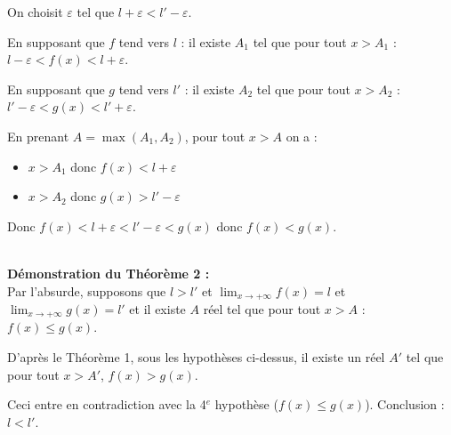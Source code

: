 \documentclass[11pt,a4paper]{article}
\begin{document}
\hfill
\begin{minipage}{0.5\textwidth}
    

    On choisit $\varepsilon$ tel que $l+\varepsilon < l'-\varepsilon$. 

    En supposant que $f$ tend vers $l$ : il existe $A_1$ tel que pour tout $x>A_1$ : $l-\varepsilon < f(x) < l+\varepsilon$.
    
    En supposant que $g$ tend vers $l'$ : il existe $A_2$ tel que pour tout $x>A_2$ : $l'-\varepsilon < g(x) < l'+\varepsilon$.
    
    En prenant $A=\max(A_1, A_2)$, pour tout $x>A$ on a :
    \begin{itemize}
        \item $x>A_1$ donc $f(x)<l+\varepsilon$
        \item $x>A_2$ donc $g(x)>l'-\varepsilon$
    \end{itemize}
    
    Donc $f(x)< l+\varepsilon < l'-\varepsilon < g(x)$ donc $f(x)<g(x)$.
\end{minipage}

\text{ }\\

\textbf{Démonstration du Théorème 2 :} ~\\

Par l'absurde, supposons que $l>l'$ et $\displaystyle\lim_{x \to +\infty} f(x) = l$ et $\displaystyle\lim_{x \to +\infty} g(x) = l'$
et il existe $A$ réel tel que pour tout $x>A$ : $f(x)\leq g(x)$.

D'après le Théorème 1, sous les hypothèses ci-dessus, il existe un réel $A'$ tel que pour tout $x>A'$, $f(x)>g(x)$.

Ceci entre en contradiction avec la 4$^e$ hypothèse ($f(x)\leq g(x)$). Conclusion : $l<l'$.
\end{document}
